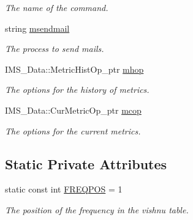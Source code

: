 \begin{DoxyCompactItemize}
\begin{DoxyCompactList}\small\item\em The name of the command. \item\end{DoxyCompactList}\item 
\hypertarget{classMetricServer_acfea52dcaac1a2274bb56e0222cd83c2}{
string \hyperlink{classMetricServer_acfea52dcaac1a2274bb56e0222cd83c2}{msendmail}}
\label{classMetricServer_acfea52dcaac1a2274bb56e0222cd83c2}

\begin{DoxyCompactList}\small\item\em The process to send mails. \item\end{DoxyCompactList}\item 
\hypertarget{classMetricServer_a372f304ae22a86e89a98bc6da42c52a5}{
IMS\_\-Data::MetricHistOp\_\-ptr \hyperlink{classMetricServer_a372f304ae22a86e89a98bc6da42c52a5}{mhop}}
\label{classMetricServer_a372f304ae22a86e89a98bc6da42c52a5}

\begin{DoxyCompactList}\small\item\em The options for the history of metrics. \item\end{DoxyCompactList}\item 
\hypertarget{classMetricServer_aa2af076810d220c2c25729f4fb0e20ab}{
IMS\_\-Data::CurMetricOp\_\-ptr \hyperlink{classMetricServer_aa2af076810d220c2c25729f4fb0e20ab}{mcop}}
\label{classMetricServer_aa2af076810d220c2c25729f4fb0e20ab}

\begin{DoxyCompactList}\small\item\em The options for the current metrics. \item\end{DoxyCompactList}\end{DoxyCompactItemize}
\subsection*{Static Private Attributes}
\begin{DoxyCompactItemize}
\item 
\hypertarget{classMetricServer_ab3238a6f396163a1cc5b8cdf79aa4c85}{
static const int \hyperlink{classMetricServer_ab3238a6f396163a1cc5b8cdf79aa4c85}{FREQPOS} = 1}
\label{classMetricServer_ab3238a6f396163a1cc5b8cdf79aa4c85}

\begin{DoxyCompactList}\small\item\em The position of the frequency in the vishnu table. \item\end{DoxyCompactList}\end{DoxyCompactItemize}



